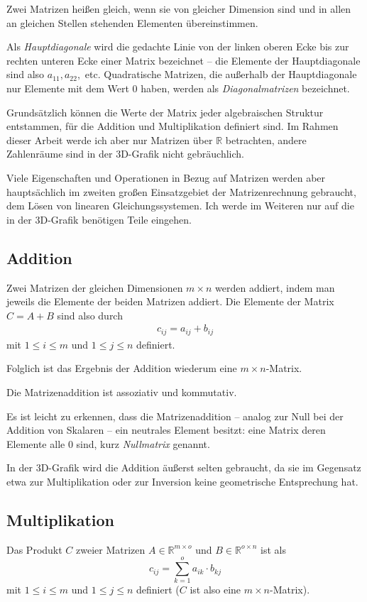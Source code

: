 Zwei Matrizen heißen gleich, wenn sie von gleicher Dimension sind und in allen an gleichen Stellen stehenden Elementen übereinstimmen. 

Als \emph{Hauptdiagonale} wird die gedachte Linie von der linken oberen Ecke bis zur rechten unteren Ecke einer Matrix bezeichnet -- die Elemente der Hauptdiagonale sind also $a_{11}, a_{22},$ etc. Quadratische Matrizen, die außerhalb der Hauptdiagonale nur Elemente mit dem Wert $0$ haben, werden als \emph{Diagonalmatrizen} bezeichnet.

Grundsätzlich können die Werte der Matrix jeder algebraischen Struktur entstammen, für die Addition und Multiplikation definiert sind. Im Rahmen dieser Arbeit werde ich aber nur Matrizen über $\mathbb R$ betrachten, andere Zahlenräume sind in der 3D-Grafik nicht gebräuchlich.

Viele Eigenschaften und Operationen in Bezug auf Matrizen werden aber hauptsächlich im zweiten großen Einsatzgebiet der Matrizenrechnung gebraucht, dem Lösen von linearen Gleichungssystemen. Ich werde im Weiteren nur auf die in der 3D-Grafik benötigen Teile eingehen.

\subsection{Addition}
Zwei Matrizen der gleichen Dimensionen $m \times n$ werden addiert, indem man jeweils die Elemente der beiden Matrizen addiert. Die Elemente der Matrix $C = A + B$ sind also durch
\begin{align}
 c_{ij} = a_{ij} + b_{ij}
\end{align}
mit $1 \leq i \leq m$ und $1 \leq j \leq n$ definiert.

Folglich ist das Ergebnis der Addition wiederum eine $m \times n$-Matrix.

Die Matrizenaddition ist assoziativ und kommutativ. 

Es ist leicht zu erkennen, dass die Matrizenaddition -- analog zur Null bei der Addition von Skalaren -- ein neutrales Element besitzt: eine Matrix deren Elemente alle $0$ sind, kurz \emph{Nullmatrix} genannt.

In der 3D-Grafik wird die Addition äußerst selten gebraucht, da sie im Gegensatz etwa zur Multiplikation oder zur Inversion keine geometrische Entsprechung hat.

\subsection{Multiplikation}
Das Produkt $C$ zweier Matrizen $A \in \mathbb{R}^{m \times o}$ und $B \in \mathbb{R}^{o \times n}$ ist als
\begin{equation}
 c_{ij} = \sum_{k=1}^o{a_{ik} \cdot b_{kj}}
\end{equation}
mit $1 \leq i \leq m$ und $1 \leq j \leq n$ definiert ($C$ ist also eine $m \times n$-Matrix).

